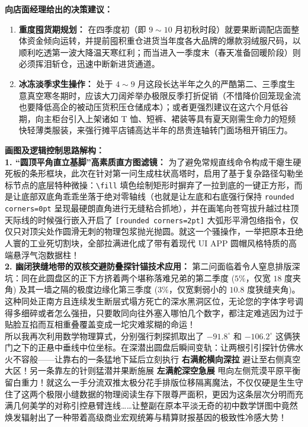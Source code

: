 \vspace{0.2cm}
\textbf{向店面经理给出的决策建议：}
\begin{enumerate}
    \item \textbf{重度囤货期规划：} 在四季度初（即 $9{\sim}10$ 月初秋时段）就要果断调配店面整体资金倾向运转，并提前囤积重仓进货当年度各大品牌的爆款羽绒服尺码，以顺利吃透第一波大降温天寒红利；而当进入一季度末（春天准备回暖阶段）则必须挥泪斩仓，迅速中断新进货通道。
    \item \textbf{冰冻淡季求生操作：} 处于 $4 \sim 9$ 月这段长达半年之久的严酷第二、三季度生意真空寒冬期时，应该大刀阔斧举办极限反季打折促销（不惜降价回笼现金流也要降低高企的被动压货积压仓储成本）；或者更强烈建议在这六个月低谷期，向主柜台引入上架诸如 T 恤、短裤、裙装等具有夏天刚需生命力的短频快轻薄类服装，来强行摊平店铺高达半年的昂贵连轴转门面场租开销压力。
\end{enumerate}

\vspace{0.6cm}

{\small\color{blue!70!black}
\textbf{画图及逻辑控制思路解构：}\\
\textbf{1. “圆顶平角直立基脚”高素质直方图滤镜：} 为了避免常规直线命令构成干瘪生硬死板的条形框块，此次在针对第一问生成柱状高塔时，启用了基于复杂路径勾勒坐标节点的底层特种微操：\texttt{\textbackslash fill} 填色绘制矩形时摒弃了一拉到底的一键正方形，而是让底部双底角乖乖坐落于绝对零轴线（也就是让左底和右底强行保持 \texttt{rounded corners=0pt} 呈现最硬朗直角进行无缝粘合抓地），并在画笔向苍穹拔升越过柱顶天际线的时候强行嵌入开启了 \texttt{[rounded corners=2pt]} 大弧形平滑包络指令，仅仅只对顶尖处作圆滑无刺的物理包浆抛光抛圆。就这一个骚操作，一举把原本丑绝人寰的工业死切割块，全部拉满进化成了带有着现代 UI APP 圆帽风格特质的高端悬浮气泡数据柱！\\
\textbf{2. 幽闭狭缝地带的双核交避防叠探针锚技术应用：} 第二问面临着令人窒息排版深坑：同在此圆盘区的正下方挤着两个堪称落难兄弟的第二季度 ($5\%$，仅宽 $18$ 度夹角) 及其一墙之隔的极度边缘化第三季度 ($3\%$，仅宽剩弱小的 $10.8$ 度狭缝夹角)。这种同处正南方且连续发生断层式塌方死亡的深水黑洞区位，无论您的字体字号调得多细碎或者怎么强扭，只要敢同向往外塞入哪怕几个数字，都注定难逃因为过于贴脸互掐而互相重叠覆盖变成一坨灾难浆糊的命运！\\
所以我再次利用数学物理算式，分别强行刺探抓取出了 $-91.8^\circ$ 和 $-106.2^\circ$ 这俩狭门之下的正悬中垂线中位坐标。在深潜出圆盘后瞬间变轨：让两根引引探针仿佛水火不容般——让靠右的一条猛地下延后立刻执行 \textbf{右满舵横向深拉} 避让至右侧真空大区！另一条靠左的针则猛潜并果断施展 \textbf{左满舵深空急展} 甩向左侧荒漠平原平衡留白重力！就这么一手分流双推太极分花手排版位移隔离魔法，不仅仅硬是生生守住了这两个极限小缝数据的物理阅读生存下限尊严面积，更因为这条层次分明而充满几何美学的对称引控悬臂连线……让整副在原本平淡无奇的初中数学饼图中竟然焕发辐射出了一种带着高级商业宏观统筹与精算财报基因的极致性冷感大势！
}


